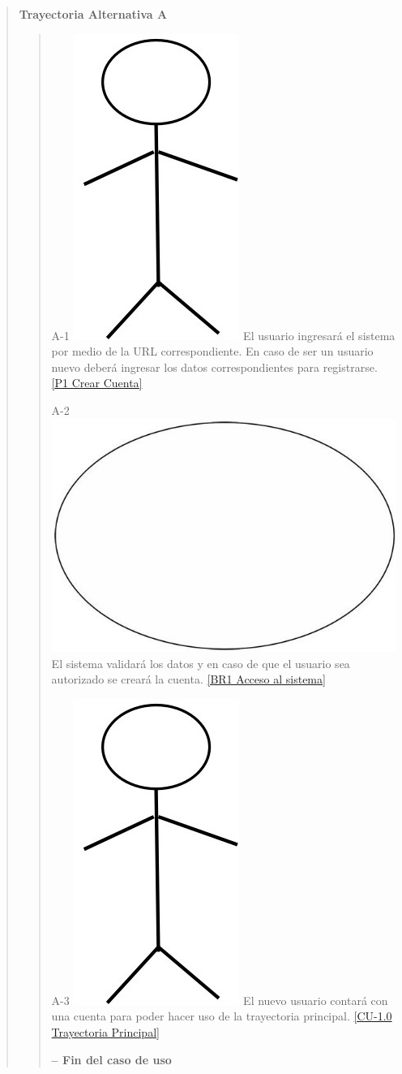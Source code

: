 \documentclass[14pt]{article}
\begin{document}
\begin{quote}
                    \vspace{0.5cm}\textbf{Trayectoria Alternativa A}\label{CU-1.0 Trayectoria Alternativa A}
                    \begin{quote}
                        \item A-1 \includegraphics[height=0.02\textwidth]{Actor.jpg}
                            \label{Actor} El usuario ingresará el sistema por medio de la URL correspondiente. En caso de ser un usuario nuevo deberá ingresar los datos correspondientes para registrarse. \ref{P1 Crear Cuenta}
                        \item A-2 \includegraphics[height=0.02\textwidth]{Sistema.jpg}
                            \label{Sistema} El sistema validará los datos y en caso de que el usuario sea autorizado se creará la cuenta. \ref{BR1 Acceso al sistema}
                        \item A-3 \includegraphics[height=0.02\textwidth]{Actor.jpg}
                            \label{Actor} El nuevo usuario contará con una cuenta para poder hacer uso de la trayectoria principal. \ref{CU-1.0 Trayectoria Principal}
                        
                        \vspace{0.3cm}\textbf{-- Fin del caso de uso}
                    \end{quote}
                

\end{quote}
\end{document}
